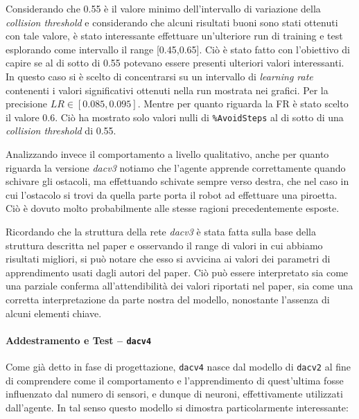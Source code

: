 Considerando che 0.55 è il valore minimo dell'intervallo di variazione della \textit{collision threshold} e considerando che alcuni risultati buoni sono stati ottenuti con tale valore, è stato interessante effettuare un'ulteriore run di training e test esplorando come intervallo il range [0.45,0.65]. Ciò è stato fatto con l'obiettivo di capire se al di sotto di 0.55 potevano essere presenti ulteriori valori interessanti. In questo caso si è scelto di concentrarsi su un intervallo di \textit{learning rate} contenenti i valori significativi ottenuti nella run mostrata nei grafici. Per la precisione $LR \in [0.085, 0.095]$. Mentre per quanto riguarda la FR è stato scelto il valore 0.6.
Ciò ha mostrato solo valori nulli di \texttt{\%AvoidSteps} al di sotto di una \textit{collision threshold} di 0.55.

Analizzando invece il comportamento a livello qualitativo, anche per quanto riguarda la versione \textit{dacv3} notiamo che l'agente apprende correttamente quando schivare gli ostacoli, ma effettuando schivate sempre verso destra, che nel caso in cui l'ostacolo si trovi da quella parte porta il robot ad effettuare una piroetta. Ciò è dovuto molto probabilmente alle stesse ragioni precedentemente esposte. 

Ricordando che la struttura della rete \textit{dacv3} è stata fatta sulla base della struttura descritta nel paper \cite{verschure1992distributed} e osservando il range di valori in cui abbiamo risultati migliori, si può notare che esso si avvicina ai valori dei parametri di apprendimento usati dagli autori del paper. Ciò può essere interpretato sia come una parziale conferma all'attendibilità dei valori riportati nel paper, sia come una corretta interpretazione da parte nostra del modello, nonostante l'assenza di alcuni elementi chiave. 

\newpage

\paragraph{Addestramento e Test -- \texttt{dacv4}}\label{par:dacv4}\hfill

Come già detto in fase di progettazione, \texttt{dacv4} nasce dal modello di \texttt{dacv2} al fine di comprendere come il comportamento e l'apprendimento di quest'ultima fosse influenzato dal numero di sensori, e dunque di neuroni, effettivamente utilizzati dall'agente. In tal senso questo modello si dimostra particolarmente interessante:

